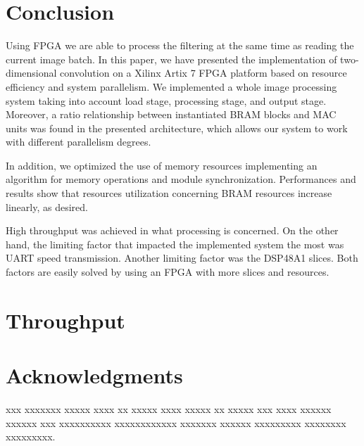 \documentclass[conference,compsoc]{IEEEtran}
\begin{document}




\section{Conclusion}\label{sec:conclusion}
Using FPGA we are able to process the filtering at the same time as reading the
current image batch. In this paper, we have presented the implementation of
two-dimensional convolution on a Xilinx Artix 7 FPGA platform based on resource
efficiency and system parallelism. We implemented a whole image processing
system taking into account load stage, processing stage, and output stage.
Moreover, a ratio relationship between instantiated BRAM blocks and MAC units was
found in the presented architecture, which allows our system to work with different
parallelism degrees.

In addition, we optimized the use of memory resources implementing an algorithm
for memory operations and module synchronization. Performances and results show that resources utilization
concerning BRAM resources increase linearly, as desired.

High throughput was achieved in what processing is concerned. On the other hand,
the limiting factor that impacted the implemented system the most was UART speed
transmission. Another limiting factor was the DSP48A1 slices. Both factors
are easily solved by using an FPGA with more slices and
resources.


\section{Throughput}






\ifCLASSOPTIONcompsoc
  \section*{Acknowledgments}
xxx xxxxxxx xxxxx xxxx xx xxxxx xxxx xxxxx xx xxxxx xxx xxxx xxxxxx xxxxxx xxx
xxxxxxxxxx xxxxxxxxxxxx xxxxxxx xxxxxx xxxxxxxxx xxxxxxxx xxxxxxxxx.
\end{document}
